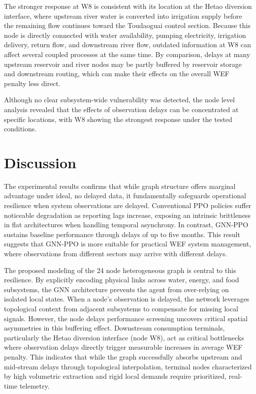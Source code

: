 \documentclass [a4paper,fleqn] {cas-dc}
\begin{document}
The stronger response at W8 is consistent with its location at the Hetao diversion interface, where upstream river water is converted into irrigation supply before the remaining flow continues toward the Toudaoguai control section. Because this node is directly connected with water availability, pumping electricity, irrigation delivery, return flow, and downstream river flow, outdated information at W8 can affect several coupled processes at the same time. By comparison, delays at many upstream reservoir and river nodes may be partly buffered by reservoir storage and downstream routing, which can make their effects on the overall WEF penalty less direct.

Although no clear subsystem-wide vulnerability was detected, the node level analysis revealed that the effects of observation delays can be concentrated at specific locations, with W8 showing the strongest response under the tested conditions.



\section{Discussion} \label{sec5}

The experimental results confirms that while graph structure offers marginal advantage under ideal, no delayed data, it fundamentally safeguards operational resilience when system observations are delayed. Conventional PPO policies suffer noticeable degradation as reporting lags increase, exposing an intrinsic brittleness in flat architectures when handling temporal asynchrony. In contrast, GNN-PPO sustains baseline performance through delays of up to five months. This result suggests that GNN-PPO is more suitable for practical WEF system management, where observations from different sectors may arrive with different delays.

The proposed modeling of the 24 node heterogeneous graph is central to this resilience. By explicitly encoding physical links across water, energy, and food subsystems, the GNN architecture prevents the agent from over-relying on isolated local states. When a node's observation is delayed, the network leverages topological context from adjacent subsystems to compensate for missing local signals. However, the node delays performance screening uncovers critical spatial asymmetries in this buffering effect. Downstream consumption terminals, particularly the Hetao diversion interface (node W8), act as critical bottlenecks where observation delays directly trigger measurable increases in average WEF penalty. This indicates that while the graph successfully absorbs upstream and mid-stream delays through topological interpolation, terminal nodes characterized by high volumetric extraction and rigid local demands require prioritized, real-time telemetry.  
\end{document}
